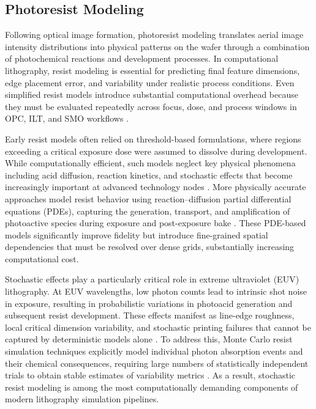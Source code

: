 \documentclass[pdflatex,sn-mathphys-num]{sn-jnl}%
\theoremstyle{thmstyleone}%
\theoremstyle{thmstyletwo}%
\theoremstyle{thmstylethree}%
\begin{document}
\subsection{Photoresist Modeling}
Following optical image formation, photoresist modeling translates aerial image intensity distributions into physical patterns on the wafer through a combination of photochemical reactions and development processes. In computational lithography, resist modeling is essential for predicting final feature dimensions, edge placement error, and variability under realistic process conditions. Even simplified resist models introduce substantial computational overhead because they must be evaluated repeatedly across focus, dose, and process windows in OPC, ILT, and SMO workflows \cite{Mack2007FundamentalPO,NEUREUTHER1992377}.

Early resist models often relied on threshold-based formulations, where regions exceeding a critical exposure dose were assumed to dissolve during development. While computationally efficient, such models neglect key physical phenomena including acid diffusion, reaction kinetics, and stochastic effects that become increasingly important at advanced technology nodes \cite{Mack2007FundamentalPO}. More physically accurate approaches model resist behavior using reaction–diffusion partial differential equations (PDEs), capturing the generation, transport, and amplification of photoactive species during exposure and post-exposure bake \cite{NEUREUTHER1992377}. These PDE-based models significantly improve fidelity but introduce fine-grained spatial dependencies that must be resolved over dense grids, substantially increasing computational cost.

Stochastic effects play a particularly critical role in extreme ultraviolet (EUV) lithography. At EUV wavelengths, low photon counts lead to intrinsic shot noise in exposure, resulting in probabilistic variations in photoacid generation and subsequent resist development. These effects manifest as line-edge roughness, local critical dimension variability, and stochastic printing failures that cannot be captured by deterministic models alone \cite{Gallatin2005}. To address this, Monte Carlo resist simulation techniques explicitly model individual photon absorption events and their chemical consequences, requiring large numbers of statistically independent trials to obtain stable estimates of variability metrics \cite{Gallatin2005}. As a result, stochastic resist modeling is among the most computationally demanding components of modern lithography simulation pipelines.
\end{document}
